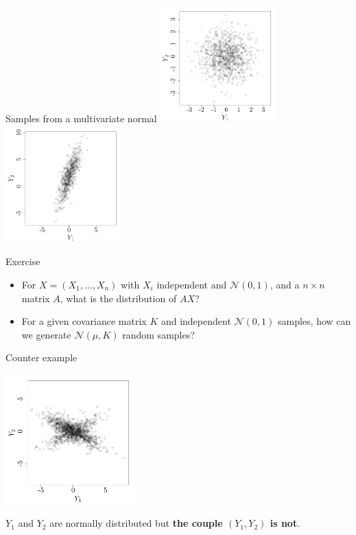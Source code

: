\documentclass{beamer}
\begin{document}
\begin{frame}{}
\begin{exampleblock}{Samples from a multivariate normal}
 \includegraphics[height=4.5cm]{figures/R/MVN_gaussvec2} \qquad \qquad \includegraphics[height=4.5cm]{figures/R/MVN_gaussvec1}
\end{exampleblock}
\vspace{-5mm}
\begin{exampleblock}{Exercise}
\begin{itemize}
  \item For $X=(X_1,\dots,X_n)$ with $X_i$ independent and $\mathcal{N}(0,1)$, and a $n \times n$ matrix $A$, what is the distribution of $AX$?
  \item For a given covariance matrix $K$ and independent $\mathcal{N}(0,1)$ samples, how can we generate $\mathcal{N}(\mu,K)$ random samples?
\end{itemize}
\end{exampleblock}
\end{frame}

\begin{frame}{}
\begin{exampleblock}{Counter example}
\begin{center}
 \includegraphics[height=5cm]{figures/R/MVN_gaussvec3}
\end{center}
$Y_1$ and $Y_2$ are normally distributed but \textbf{the couple $(Y_1,Y_2)$ is not}.
\end{exampleblock}
\end{frame}
\end{document}

